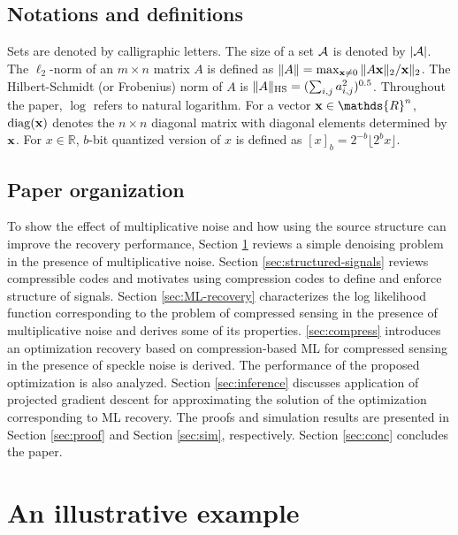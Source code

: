 \documentclass[onecolumn]{IEEEtran}
\begin{document}
\subsection{Notations and definitions}

Sets are denoted by calligraphic letters.
The size of a set $\mathcal{A}$ is denoted by $|\mathcal{A}|$.
The $\ell_2$-norm of  an $m\times n$ matrix $A$ is defined as $\|A\|=\max_{{\bf x}\neq 0} \|A{\bf x}\|_2/{\bf x}\|_2$.
The Hilbert-Schmidt (or Frobenius) norm of $A$ is $\|A\|_{\rm HS}=(\sum_{i,j}a_{i,j}^2)^{0.5}$.
Throughout the paper, $\log$ refers to natural logarithm.
For a vector $\xv\in\mathds{R}^n$, ${\rm diag}({\bf x})$ denotes the $n\times n$ diagonal matrix with diagonal elements determined by ${\bf x}$.
For $x\in\mathds{R}$, $b$-bit quantized version of $x$ is defined as $[x]_b=2^{-b}\lfloor2^b x \rfloor$. 


\subsection{Paper organization}
To show the effect of multiplicative noise and how using the source structure can improve the recovery performance,  Section \ref{sec:denoise} reviews a simple denoising problem in the presence of multiplicative noise. Section \ref{sec:structured-signals} reviews compressible codes and motivates using
compression codes to define and enforce  structure of signals. Section \ref{sec:ML-recovery} characterizes the log likelihood function corresponding to the problem of compressed sensing in the presence of multiplicative noise and derives some of its properties.  \ref{sec:compress} introduces  an optimization recovery based on  compression-based ML   for compressed sensing
in the presence of speckle noise is derived. The performance of the proposed optimization is also analyzed. Section
\ref{sec:inference} discusses application of projected gradient descent for
approximating the solution of the optimization corresponding to ML recovery. The
proofs and simulation results are presented in Section \ref{sec:proof} and
Section \ref{sec:sim}, respectively. Section \ref{sec:conc} concludes the paper.




\section{An illustrative example}\label{sec:denoise}
\end{document}
